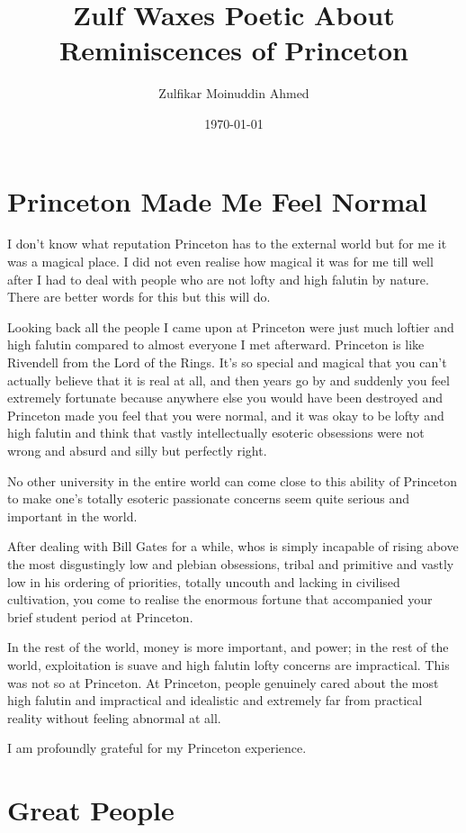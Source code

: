 \documentclass{amsart}
\title{Zulf Waxes Poetic About Reminiscences of Princeton}
\author{Zulfikar Moinuddin Ahmed}
\date{\today}
\begin{document}
\maketitle

\section{Princeton Made Me Feel Normal}

I don't know what reputation Princeton has to the external world but for me it was a magical place.  I did not even realise how magical it was for me till well after I had to deal with people who are not lofty and high falutin by nature.  There are better words for this but this will do.

Looking back all the people I came upon at Princeton were just much loftier and high falutin compared to almost everyone I met afterward.  Princeton is like Rivendell from the Lord of the Rings.  It's so special and magical that you can't actually believe that it is real at all, and then years go by and suddenly you feel extremely fortunate because anywhere else you would have been destroyed and Princeton made you feel that you were normal, and it was okay to be lofty and high falutin and think that vastly intellectually esoteric obsessions were not wrong and absurd and silly but perfectly right.

No other university in the entire world can come close to this ability of Princeton to make one's totally esoteric passionate concerns seem quite serious and important in the world.

After dealing with Bill Gates for a while, whos is simply incapable of rising above the most disgustingly low and plebian obsessions, tribal and primitive and vastly low in his ordering of priorities, totally uncouth and lacking in civilised cultivation, you come to realise the enormous fortune that accompanied your brief student period at Princeton.  

In the rest of the world, money is more important, and power; in the rest of the world, exploitation is suave and high falutin lofty concerns are impractical.  This was not so at Princeton.  At Princeton, people genuinely cared about the most high falutin and impractical and idealistic and extremely far from practical reality without feeling abnormal at all.  

I am profoundly grateful for my Princeton experience.  

\section{Great People}
\end{document}
